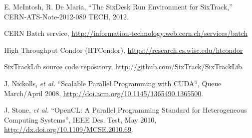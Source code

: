\documentclass[a4paper,
              ]{jacow}
\begin{document}
\begin{thebibliography}{99}
E. McIntosh, R. De Maria, ``The SixDesk Run Environment for SixTrack,''
CERN-ATS-Note-2012-089 TECH, 2012.

CERN Batch service, \url{http://information-technology.web.cern.ch/services/batch}

High Throughput Condor (HTCondor), \url{https://research.cs.wisc.edu/htcondor}

















 SixTrackLib source code repository, \url{http://github.com/SixTrack/SixTrackLib}.

 J. Nickolls, {\it et al.} ``Scalable Parallel Programming with CUDA``, Queue March/April 2008, \url{http://doi.acm.org/10.1145/1365490.1365500}.

 J. Stone, {\it et al.} ``OpenCL: A Parallel Programming Standard for Heterogeneous Computing Systems'', IEEE Des. Test, May 2010, \url{http://dx.doi.org/10.1109/MCSE.2010.69}.



\end{thebibliography}
\end{document}
